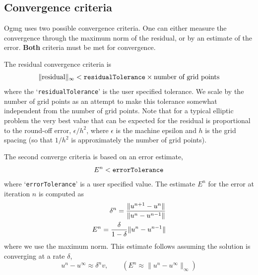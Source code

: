 \documentclass{article}
\begin{document}
% 


\subsection{Convergence criteria}

Ogmg uses two possible convergence criteria.  One can either measure
the convergence through the maximum norm of the residual, or by an
estimate of the error. {\bf Both} criteria must be met for
convergence.

The residual convergence
criteria is
\[
    \| \text{residual} \|_{\infty} < \text{\tt residualTolerance} \times \text{number of grid points}
\]
where the `{\tt residualTolerance}' is the user specified tolerance. We scale by the 
number of grid points as an attempt to make this tolerance somewhat independent from the
number of grid points. Note that for a typical elliptic problem the very best value that can be
expected for the residual is proportional to the round-off error, $\epsilon/h^2$,
where $\epsilon$ is the machine epsilon and $h$ is
the grid spacing (so that $1/h^2$ is approximately the number of grid points).

The second converge criteria is based on an error estimate,
\[
     E^n < \text{\tt errorTolerance}
\]
where `{\tt errorTolerance}' is a user specified value.
The estimate $E^n$ for the error at iteration $n$ is computed as
\begin{align*}
   \delta^n = { \| u^{n+1} - u^n \| \over \| u^n - u^{n-1} \| } \\
   E^n = {\delta\over 1-\delta} \| u^n - u^{n-1} \| 
\end{align*}
where we use the maximum norm. This estimate follows assuming the
solution is converging at a rate $\delta$,
\[
    u^n - u^\infty \approx \delta^n v, \qquad ( E^n \approx \| u^n - u^\infty \|_\infty )
\]
\end{document}
